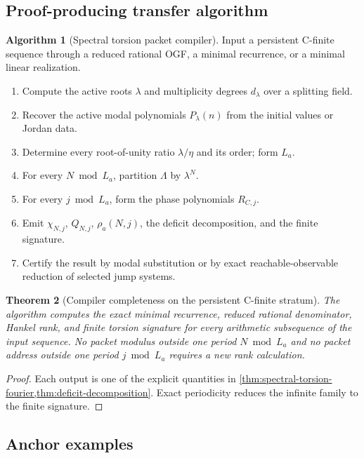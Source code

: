 \documentclass[11pt]{article}
\newtheorem{theorem}{Theorem}[section]\newtheorem{proposition}[theorem]{Proposition}\newtheorem{lemma}[theorem]{Lemma}\newtheorem{corollary}[theorem]{Corollary}
\theoremstyle{definition}\newtheorem{definition}[theorem]{Definition}\newtheorem{example}[theorem]{Example}\newtheorem{construction}[theorem]{Construction}\newtheorem{algorithm}[theorem]{Algorithm}\newtheorem{conjecture}[theorem]{Conjecture}\newtheorem{problem}[theorem]{Problem}
\theoremstyle{remark}\newtheorem{remark}[theorem]{Remark}\newtheorem{boundary}[theorem]{Boundary}\newtheorem{certificate}[theorem]{Computational Certificate}\newtheorem{classical}[theorem]{Classical Input}\newtheorem{principle}[theorem]{Structural Principle}
\begin{document}
\subsection{Proof-producing transfer algorithm}

\begin{algorithm}[Spectral torsion packet compiler]
\label{alg:spectral-torsion-compiler}
Input a persistent C-finite sequence through a reduced rational OGF, a minimal recurrence, or a minimal linear realization.
\begin{enumerate}
\item Compute the active roots $\lambda$ and multiplicity degrees $d_\lambda$ over a splitting field.
\item Recover the active modal polynomials $P_\lambda(n)$ from the initial values or Jordan data.
\item Determine every root-of-unity ratio $\lambda/\eta$ and its order; form $L_a$.
\item For every $N\bmod L_a$, partition $\Lambda$ by $\lambda^N$.
\item For every $j\bmod L_a$, form the phase polynomials $R_{C,j}$.
\item Emit $\chi_{N,j}$, $Q_{N,j}$, $\rho_a(N,j)$, the deficit decomposition, and the finite signature.
\item Certify the result by modal substitution or by exact reachable-observable reduction of selected jump systems.
\end{enumerate}
\end{algorithm}

\begin{theorem}[Compiler completeness on the persistent C-finite stratum]
The algorithm computes the exact minimal recurrence, reduced rational denominator, Hankel rank, and finite torsion signature for every arithmetic subsequence of the input sequence.  No packet modulus outside one period $N\bmod L_a$ and no packet address outside one period $j\bmod L_a$ requires a new rank calculation.
\end{theorem}

\begin{proof}
Each output is one of the explicit quantities in \cref{thm:spectral-torsion-fourier,thm:deficit-decomposition}.  Exact periodicity reduces the infinite family to the finite signature.
\end{proof}

\subsection{Anchor examples}
\end{document}

